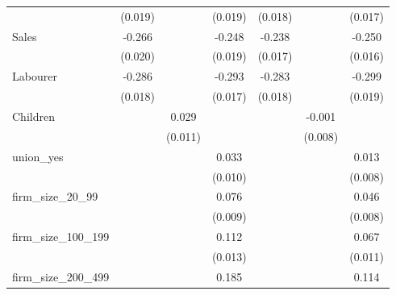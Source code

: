 {\begin{tabular}{l*{6}{c}}
                    &     (0.019)         &                     &     (0.019)         &     (0.018)         &                     &     (0.017)         \\
Sales               &      -0.266\sym{***}&                     &      -0.248\sym{***}&      -0.238\sym{***}&                     &      -0.250\sym{***}\\
                    &     (0.020)         &                     &     (0.019)         &     (0.017)         &                     &     (0.016)         \\
Labourer            &      -0.286\sym{***}&                     &      -0.293\sym{***}&      -0.283\sym{***}&                     &      -0.299\sym{***}\\
                    &     (0.018)         &                     &     (0.017)         &     (0.018)         &                     &     (0.019)         \\
Children            &                     &       0.029\sym{***}&                     &                     &      -0.001         &                     \\
                    &                     &     (0.011)         &                     &                     &     (0.008)         &                     \\
union\_yes           &                     &                     &       0.033\sym{***}&                     &                     &       0.013         \\
                    &                     &                     &     (0.010)         &                     &                     &     (0.008)         \\
firm\_size\_20\_99     &                     &                     &       0.076\sym{***}&                     &                     &       0.046\sym{***}\\
                    &                     &                     &     (0.009)         &                     &                     &     (0.008)         \\
firm\_size\_100\_199   &                     &                     &       0.112\sym{***}&                     &                     &       0.067\sym{***}\\
                    &                     &                     &     (0.013)         &                     &                     &     (0.011)         \\
firm\_size\_200\_499   &                     &                     &       0.185\sym{***}&                     &                     &       0.114\sym{***}\\

\end{tabular}}
